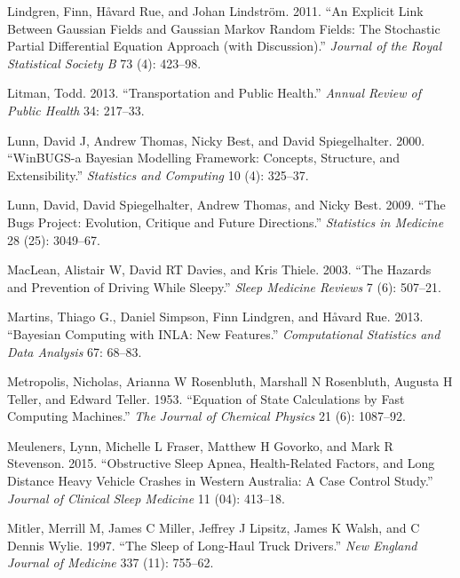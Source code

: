 \documentclass[12pt]{book}
\numberwithin{equation}{chapter}
\begin{document}
\leavevmode\hypertarget{ref-Lindgren2011}{}%
Lindgren, Finn, Håvard Rue, and Johan Lindström. 2011. ``An Explicit Link Between Gaussian Fields and Gaussian Markov Random Fields: The Stochastic Partial Differential Equation Approach (with Discussion).'' \emph{Journal of the Royal Statistical Society B} 73 (4): 423--98.

\leavevmode\hypertarget{ref-litman2013transportation}{}%
Litman, Todd. 2013. ``Transportation and Public Health.'' \emph{Annual Review of Public Health} 34: 217--33.

\leavevmode\hypertarget{ref-lunn2000winbugs}{}%
Lunn, David J, Andrew Thomas, Nicky Best, and David Spiegelhalter. 2000. ``WinBUGS-a Bayesian Modelling Framework: Concepts, Structure, and Extensibility.'' \emph{Statistics and Computing} 10 (4): 325--37.

\leavevmode\hypertarget{ref-lunn2009bugs}{}%
Lunn, David, David Spiegelhalter, Andrew Thomas, and Nicky Best. 2009. ``The Bugs Project: Evolution, Critique and Future Directions.'' \emph{Statistics in Medicine} 28 (25): 3049--67.

\leavevmode\hypertarget{ref-maclean2003hazards}{}%
MacLean, Alistair W, David RT Davies, and Kris Thiele. 2003. ``The Hazards and Prevention of Driving While Sleepy.'' \emph{Sleep Medicine Reviews} 7 (6): 507--21.

\leavevmode\hypertarget{ref-Thiago2013}{}%
Martins, Thiago G., Daniel Simpson, Finn Lindgren, and Håvard Rue. 2013. ``Bayesian Computing with INLA: New Features.'' \emph{Computational Statistics and Data Analysis} 67: 68--83.

\leavevmode\hypertarget{ref-metropolis1953equation}{}%
Metropolis, Nicholas, Arianna W Rosenbluth, Marshall N Rosenbluth, Augusta H Teller, and Edward Teller. 1953. ``Equation of State Calculations by Fast Computing Machines.'' \emph{The Journal of Chemical Physics} 21 (6): 1087--92.

\leavevmode\hypertarget{ref-meuleners2015obstructive}{}%
Meuleners, Lynn, Michelle L Fraser, Matthew H Govorko, and Mark R Stevenson. 2015. ``Obstructive Sleep Apnea, Health-Related Factors, and Long Distance Heavy Vehicle Crashes in Western Australia: A Case Control Study.'' \emph{Journal of Clinical Sleep Medicine} 11 (04): 413--18.

\leavevmode\hypertarget{ref-mitler1997sleep}{}%
Mitler, Merrill M, James C Miller, Jeffrey J Lipsitz, James K Walsh, and C Dennis Wylie. 1997. ``The Sleep of Long-Haul Truck Drivers.'' \emph{New England Journal of Medicine} 337 (11): 755--62.
\end{document}
